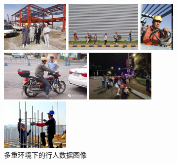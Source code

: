 \documentclass[journal]{IEEEtran}
\numberwithin{figure}{section}%
\begin{document}
\begin{figure}[h]
	
	\begin{minipage}{0.32\linewidth}
		\vspace{3pt}
		\centerline{\includegraphics[width=\textwidth,height=2.5cm]{figures/2_1.jpg}}
		\centerline{\includegraphics[width=\textwidth,height=2.5cm]{figures/2_2.jpg}}
	\end{minipage}
	\begin{minipage}{0.32\linewidth}
		\vspace{3pt}
		\centerline{\includegraphics[width=\textwidth,height=2.5cm]{figures/2_3.jpg}}
	 
		\centerline{\includegraphics[width=\textwidth,height=2.5cm]{figures/2_4.jpg}}
	\end{minipage}
	\begin{minipage}{0.32\linewidth}
		\vspace{3pt}
		\centerline{\includegraphics[width=\textwidth,height=2.5cm]{figures/2_5.jpg}}
	 
		\centerline{\includegraphics[width=\textwidth,height=2.5cm]{figures/2_6.jpg}}
	\end{minipage}
 
	\caption{多重环境下的行人数据图像}
	\label{fig4}
\end{figure}
\end{document}
